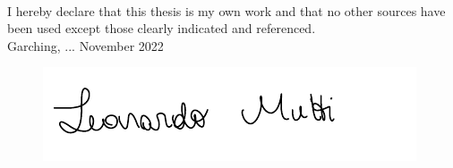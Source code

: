 \documentclass[english,a4paper,10pt,oneside]{scrbook}	%
\theoremstyle{break}
\theoremstyle{remark}
\begin{document}
\pagestyle{empty}       %



\mbox{}\\

\newpage    %
\pagestyle{plain}

\vspace*{19cm}
\noindent
I hereby declare that this thesis is my own work and that no other sources have been used except those clearly indicated and referenced.
\\[1cm]
Garching, ... November 2022
\begin{figure}[H]
\includegraphics[width=0.3\columnwidth]{Images/signature.pdf}
\end{figure}
\end{document}
